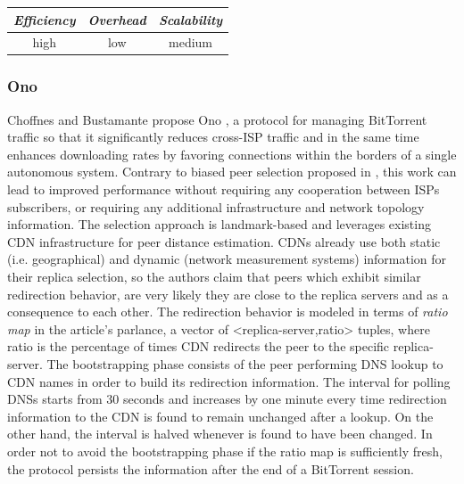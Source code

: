 \begin{center}
\begin{tabular}{ccc}
\emph{Efficiency} & \emph{Overhead} & \emph{Scalability} \\
\hline
high &
low &
medium
\end{tabular}
\end{center}

\subsubsection{Ono}
Choffnes and Bustamante propose Ono \cite{CB2008}, a protocol for managing
BitTorrent traffic so that it significantly reduces cross-ISP traffic and in the
same time enhances downloading rates by favoring connections within the borders
of a single autonomous system. Contrary to biased peer selection proposed in
\cite{BCCMSBZ2006}, this work can lead to improved performance without requiring
any cooperation between ISPs subscribers, or requiring any additional
infrastructure and network topology information. The selection approach is
landmark-based and leverages existing CDN infrastructure for peer distance
estimation. CDNs already use both static (i.e. geographical) and dynamic
(network measurement systems) information for their replica selection, so the
authors claim that peers which exhibit similar redirection behavior, are very
likely they are close to the replica servers and as a consequence to each other.
The redirection behavior is modeled in terms of \emph{ratio map} in the
article's parlance, a vector of <replica-server,ratio> tuples, where ratio is
the percentage of times CDN redirects the peer to the specific replica-server.
The bootstrapping phase consists of the peer performing DNS lookup to CDN names
in order to build its redirection information. The interval for polling DNSs
starts from 30 seconds and increases by one minute every time redirection
information to the CDN is found to remain unchanged after a lookup. On the other
hand, the interval is halved whenever is found to have been changed. In order
not to avoid the bootstrapping phase if the ratio map is sufficiently fresh, the
protocol persists the information after the end of a BitTorrent session.

